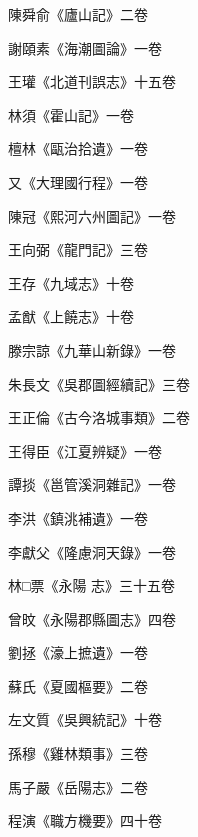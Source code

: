 \begin{pinyinscope}
 陳舜俞《廬山記》二卷



 謝頤素《海潮圖論》一卷



 王瓘《北道刊誤志》十五卷



 林須《霍山記》一卷



 檀林《甌治拾遺》一卷



 又《大理國行程》一卷



 陳冠《熙河六州圖記》一卷



 王向弼《龍門記》三卷



 王存《九域志》十卷



 孟猷《上饒志》十卷



 滕宗諒《九華山新錄》一卷



 朱長文《吳郡圖經續記》三卷



 王正倫《古今洛城事類》二卷



 王得臣《江夏辨疑》一卷



 譚掞《邕管溪洞雜記》一卷



 李洪《鎮洮補遺》一卷



 李獻父《隆慮洞天錄》一卷



 林□票《永陽
 志》三十五卷



 曾旼《永陽郡縣圖志》四卷



 劉拯《濠上摭遺》一卷



 蘇氏《夏國樞要》二卷



 左文質《吳興統記》十卷



 孫穆《雞林類事》三卷



 馬子嚴《岳陽志》二卷



 程演《職方機要》四十卷




\end{pinyinscope}
